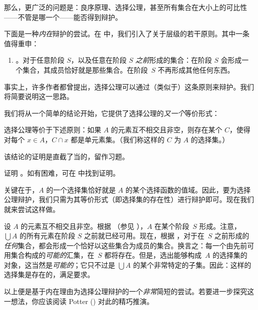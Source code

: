\documentclass[../../../include/open-logic-section]{subfiles}
\begin{document}

那么，更广泛的问题是：良序原理、选择公理，甚至所有集合在大小上的可比性——不管是哪一个——能否得到辩护。

下面是一种\emph{内在}辩护的尝试。在  中，我们引入了关于层级的若干原则。其中一条值得重申：

\begin{enumerate}
	\item[] \stagesacc{}。对于任意阶段 $S$，以及任意在阶段 $S$ \emph{之前}形成的集合：在阶段 $S$ 会形成一个集合，其成员恰好就是那些集合。在阶段~$S$ 不再形成其他任何东西。
\end{enumerate}

事实上，许多作者都曾提出，选择公理可以通过（类似于）这条原则来辩护。我们将简要说明这一思路。

我们将从一个简单的结论开始，它提供了选择公理的\emph{又一个}等价形式：

\begin{thm}[在 $\ZF$ 中]
选择公理等价于下述原则：如果 $A$ 的元素互不相交且非空，则存在某个 $C$，使得对每个 $x \in A$，$C \cap x$ 都是单元素集。（我们称这样的 $C$ 为 $A$ 的{选择集}。）
\end{thm}

该结论的证明是直截了当的，留作习题。

\begin{prob}
证明 。如有困难，可在 \cite[pp.~242--3]{Potter2004} 中找到证明。
\end{prob}

关键在于，$A$ 的一个选择集恰好就是 $A$ 的某个选择函数的值域。因此，要为选择公理辩护，我们只需为其等价形式（即选择集的存在性）进行辩护即可。现在我们就来尝试这样做。

设 $A$ 的元素互不相交且非空。根据 \stageshier{}（参见 ），$A$ 在某个阶段~$S$ 形成。注意，$\bigcup A$ 的所有元素在阶段 $S$ 之前就已经可用。现在，根据 \stagesacc{}，对于在~$S$ 之前形成的\emph{任何}集合，都会形成一个恰好以这些集合为成员的集合。换言之：每一个由先前可用集合构成的\emph{可能的}汇集，在~$S$ 都将存在。但是，选出能够构成~$A$ 的选择集的对象，这当然是\emph{可能的}；它只不过是 $\bigcup A$ 的某个非常特定的子集。因此：这样的选择集是存在的，满足要求。

以上便是基于内在理由为选择公理辩护的一个\emph{非常}简短的尝试。若要进一步探究这一想法，你应该阅读 Potter (\citeyear[\S14.8]{Potter2004}) 对此的精巧推演。
\end{document}
